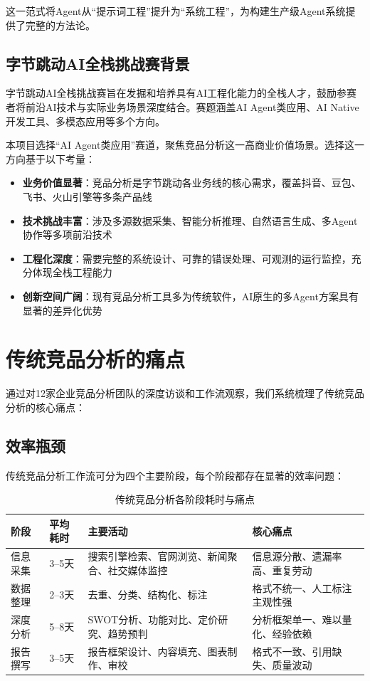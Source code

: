 \documentclass[12pt,a4paper]{ctexrep}
\begin{document}
这一范式将Agent从``提示词工程''提升为``系统工程''，为构建生产级Agent系统提供了完整的方法论。

\subsection{字节跳动AI全栈挑战赛背景}

字节跳动AI全栈挑战赛旨在发掘和培养具有AI工程化能力的全栈人才，鼓励参赛者将前沿AI技术与实际业务场景深度结合。赛题涵盖AI Agent类应用、AI Native开发工具、多模态应用等多个方向。

本项目选择``AI Agent类应用''赛道，聚焦竞品分析这一高商业价值场景。选择这一方向基于以下考量：

\begin{itemize}[leftmargin=2em]
\item \textbf{业务价值显著}：竞品分析是字节跳动各业务线的核心需求，覆盖抖音、豆包、飞书、火山引擎等多条产品线
\item \textbf{技术挑战丰富}：涉及多源数据采集、智能分析推理、自然语言生成、多Agent协作等多项前沿技术
\item \textbf{工程化深度}：需要完整的系统设计、可靠的错误处理、可观测的运行监控，充分体现全栈工程能力
\item \textbf{创新空间广阔}：现有竞品分析工具多为传统软件，AI原生的多Agent方案具有显著的差异化优势
\end{itemize}

\section{传统竞品分析的痛点}

通过对12家企业竞品分析团队的深度访谈和工作流观察，我们系统梳理了传统竞品分析的核心痛点：

\subsection{效率瓶颈}

传统竞品分析工作流可分为四个主要阶段，每个阶段都存在显著的效率问题：

\begin{table}[H]
\centering
\caption{传统竞品分析各阶段耗时与痛点}
\label{tab:traditional-pain}
{\small
\begin{tabular}{p{2.5cm} p{2cm} p{4cm} p{4.5cm}}
\toprule
\textbf{阶段} & \textbf{平均耗时} & \textbf{主要活动} & \textbf{核心痛点} \\
\midrule
信息采集 & 3--5天 & 搜索引擎检索、官网浏览、新闻聚合、社交媒体监控 & 信息源分散、遗漏率高、重复劳动 \\
\addlinespace
数据整理 & 2--3天 & 去重、分类、结构化、标注 & 格式不统一、人工标注主观性强 \\
\addlinespace
深度分析 & 5--8天 & SWOT分析、功能对比、定价研究、趋势预判 & 分析框架单一、难以量化、经验依赖 \\
\addlinespace
报告撰写 & 3--5天 & 报告框架设计、内容填充、图表制作、审校 & 格式不一致、引用缺失、质量波动 \\
\bottomrule
\end{tabular}
}
\end{table}
\end{document}
